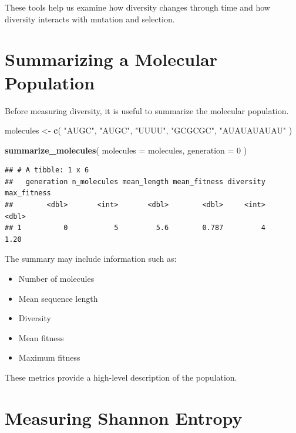\documentclass[
  oneside,
  openany]{book}
\newenvironment{Shaded}{\begin{snugshade}}{\end{snugshade}}
\newcommand{\AttributeTok}[1]{\textcolor[rgb]{0.13,0.29,0.53}{#1}}
\newcommand{\DecValTok}[1]{\textcolor[rgb]{0.00,0.00,0.81}{#1}}
\newcommand{\FunctionTok}[1]{\textcolor[rgb]{0.13,0.29,0.53}{\textbf{#1}}}
\newcommand{\NormalTok}[1]{#1}
\newcommand{\OtherTok}[1]{\textcolor[rgb]{0.56,0.35,0.01}{#1}}
\newcommand{\StringTok}[1]{\textcolor[rgb]{0.31,0.60,0.02}{#1}}
\providecommand{\tightlist}{%
  \setlength{\itemsep}{0pt}\setlength{\parskip}{0pt}}
\begin{document}
These tools help us examine how diversity changes through time and how diversity interacts with mutation and selection.

\section{Summarizing a Molecular Population}\label{summarizing-a-molecular-population}

Before measuring diversity, it is useful to summarize the molecular population.

\begin{Shaded}
\begin{Highlighting}[]
\NormalTok{molecules }\OtherTok{\textless{}{-}} \FunctionTok{c}\NormalTok{(}
  \StringTok{"AUGC"}\NormalTok{,}
  \StringTok{"AUGC"}\NormalTok{,}
  \StringTok{"UUUU"}\NormalTok{,}
  \StringTok{"GCGCGC"}\NormalTok{,}
  \StringTok{"AUAUAUAUAU"}
\NormalTok{)}

\FunctionTok{summarize\_molecules}\NormalTok{(}
  \AttributeTok{molecules =}\NormalTok{ molecules,}
  \AttributeTok{generation =} \DecValTok{0}
\NormalTok{)}
\end{Highlighting}
\end{Shaded}

\begin{verbatim}
## # A tibble: 1 x 6
##   generation n_molecules mean_length mean_fitness diversity max_fitness
##        <dbl>       <int>       <dbl>        <dbl>     <int>       <dbl>
## 1          0           5         5.6        0.787         4        1.20
\end{verbatim}

The summary may include information such as:

\begin{itemize}
\tightlist
\item
  Number of molecules
\item
  Mean sequence length
\item
  Diversity
\item
  Mean fitness
\item
  Maximum fitness
\end{itemize}

These metrics provide a high-level description of the population.

\section{Measuring Shannon Entropy}\label{measuring-shannon-entropy}
\end{document}
